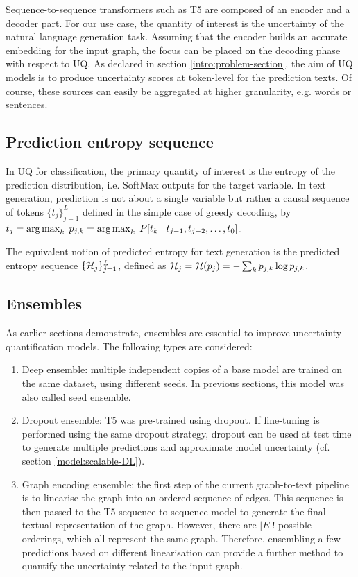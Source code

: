 Sequence-to-sequence transformers such as T5 are composed of an encoder and a decoder part. For our use case, the quantity of interest is the uncertainty of the natural language generation task. Assuming that the encoder builds an accurate embedding for the input graph, the focus can be placed on the decoding phase with respect to UQ. As declared in section \ref{intro:problem-section}, the aim of UQ models is to produce uncertainty scores at token-level for the prediction texts. Of course, these sources can easily be aggregated at higher granularity, e.g. words or sentences. 

\subsection{Prediction entropy sequence} \label{models:entropy-sequence}

In UQ for classification, the primary quantity of interest is the entropy of the prediction distribution, i.e. SoftMax outputs for the target variable. In text generation, prediction is not about a single variable but rather a causal sequence of tokens $\{t_j\}_{j=1}^L$ defined in the simple case of greedy decoding, by 
$
    t_j = \operatorname*{\arg\max}_k \; p_{j,k} = \operatorname*{\arg\max}_k \; P[t_k \mid t_{j-1}, t_{j-2}, \ldots, t_{0}]
$.

The equivalent notion of predicted entropy for text generation is the predicted entropy sequence $\{\operatorname{\mathcal{H}}_j\}_{j=1}^L$, defined as $\operatorname{\mathcal{H}}_j = \operatorname{\mathcal{H}}(p_j) = - \sum_k p_{j,k} \log p_{j,k} $.

\subsection{Ensembles}

As earlier sections demonstrate, ensembles are essential to improve uncertainty quantification models. The following types are considered:

\begin{enumerate}
    \item Deep ensemble: multiple independent copies of a base model are trained on the same dataset, using different seeds. In previous sections, this model was also called seed ensemble. 
    \item Dropout ensemble: T5 was pre-trained using dropout. If fine-tuning is performed using the same dropout strategy, dropout can be used at test time to generate multiple predictions and approximate model uncertainty (cf. section \ref{model:scalable-DL}).
    \item \label{model:graph-encoding-ensemble} Graph encoding ensemble: the first step of the current graph-to-text pipeline is to linearise the graph into an ordered sequence of edges. This sequence is then passed to the T5 sequence-to-sequence model to generate the final textual representation of the graph. However, there are $|E|!$ possible orderings, which all represent the same graph. Therefore, ensembling a few predictions based on different linearisation can provide a further method to quantify the uncertainty related to the input graph.
\end{enumerate}

